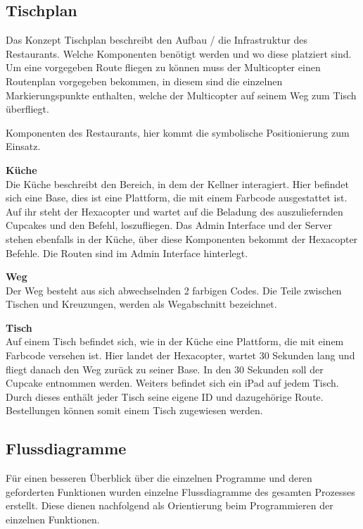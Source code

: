   \subsection{Tischplan}

  Das Konzept Tischplan beschreibt den Aufbau / die Infrastruktur des Restaurants. Welche Komponenten benötigt werden und wo diese platziert sind.
  Um eine vorgegeben Route fliegen zu können muss der Multicopter einen Routenplan vorgegeben bekommen, in diesem sind die einzelnen Markierungspunkte enthalten, welche der Multicopter auf seinem Weg zum Tisch überfliegt.

  Komponenten des Restaurants, hier kommt die symbolische Positionierung zum Einsatz.

  \textbf{Küche}\\
  Die Küche beschreibt den Bereich, in dem der Kellner interagiert. Hier befindet sich eine Base, dies ist eine Plattform, die mit einem Farbcode ausgestattet ist. Auf ihr steht der Hexacopter und wartet auf die Beladung des auszuliefernden Cupcakes und den Befehl, loszufliegen.
  Das Admin Interface und der Server stehen ebenfalls in der Küche, über diese Komponenten bekommt der Hexacopter Befehle. Die Routen sind im Admin Interface hinterlegt.

  \textbf{Weg}\\
  Der Weg besteht aus sich abwechselnden 2 farbigen Codes. Die Teile zwischen Tischen und Kreuzungen, werden als Wegabschnitt bezeichnet. 

  \textbf{Tisch}\\
  Auf einem Tisch befindet sich, wie in der Küche eine Plattform, die mit einem Farbcode versehen ist. Hier landet der Hexacopter, wartet 30 Sekunden lang und fliegt danach den Weg zurück zu seiner Base. In den 30 Sekunden soll der Cupcake entnommen werden. Weiters befindet sich ein iPad auf jedem Tisch. Durch dieses enthält jeder Tisch seine eigene ID und dazugehörige Route. Bestellungen können somit einem Tisch zugewiesen werden.



  \subsection{Flussdiagramme}
  Für einen besseren Überblick über die einzelnen Programme und deren geforderten Funktionen wurden einzelne Flussdiagramme des gesamten Prozesses erstellt.
  Diese dienen nachfolgend als Orientierung beim Programmieren der einzelnen Funktionen.

